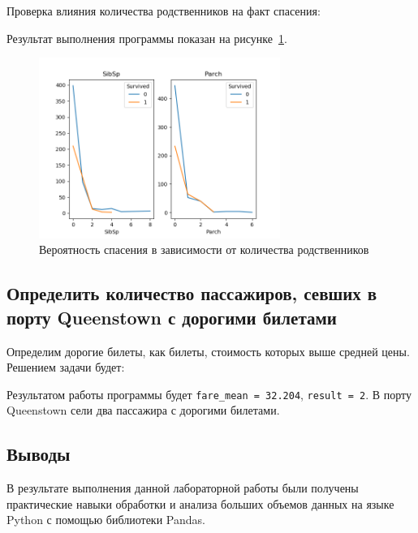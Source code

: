 Проверка влияния количества родственников на факт спасения:  
 

Результат выполнения программы показан на рисунке~\ref{fig:example2}.

\begin{figure}[H]
    \centering
        \includegraphics[width=0.7\textwidth]{example2}
    \caption{Вероятность спасения в зависимости от количества родственников}
    \label{fig:example2}
\end{figure}

\subsection{Определить количество пассажиров, севших в порту Queenstown с дорогими билетами}
Определим дорогие билеты, как билеты, стоимость которых выше средней цены. Решением задачи будет:



Результатом работы программы будет \texttt{fare\_mean = 32.204}, \texttt{result = 2}. В порту Queenstown сели два пассажира с дорогими билетами.

\subsection*{Выводы}
В результате выполнения данной лабораторной работы были получены практические навыки обработки и анализа больших объемов данных на языке Python с помощью библиотеки Pandas.


